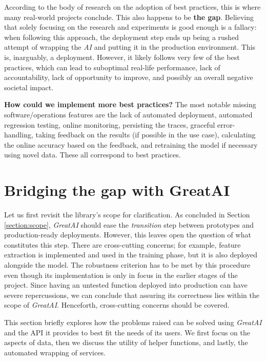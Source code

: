 According to the body of research on the adoption of best practices, this is where many real-world projects conclude. This also happens to be \textbf{the gap}. Believing that solely focusing on the research and experiments is good enough is a fallacy: when following this approach, the deployment step ends up being a rushed attempt of wrapping the \textit{AI} and putting it in the production environment. This is, inarguably, a deployment. However, it likely follows very few of the best practices, which can lead to suboptimal real-life performance, lack of accountability, lack of opportunity to improve, and possibly an overall negative societal impact.

\begin{displayquote}
\textbf{How could we implement more best practices?} The most notable missing software/operations features are the lack of automated deployment, automated regression testing, online monitoring, persisting the traces, graceful error-handling, taking feedback on the results (if possible in the use case), calculating the online accuracy based on the feedback, and retraining the model if necessary using novel data. These all correspond to best practices.
\end{displayquote}

\section{Bridging the gap with GreatAI}

Let us first revisit the library's scope for clarification. As concluded in Section \ref{section:scope}, \textit{GreatAI} should ease the \textit{transition} step between prototypes and production-ready deployments. However, this leaves open the question of what constitutes this step. There are cross-cutting concerns; for example, feature extraction is implemented and used in the training phase, but it is also deployed alongside the model. The robustness criterion has to be met by this procedure even though its implementation is only in focus in the earlier stages of the project. Since having an untested function deployed into production can have severe repercussions, we can conclude that assuring its correctness lies within the scope of \textit{GreatAI}. Henceforth, cross-cutting concerns should be covered.

This section briefly explores how the problems raised can be solved using \textit{GreatAI} and the API it provides to best fit the needs of its users. We first focus on the aspects of data, then we discuss the utility of helper functions, and lastly, the automated wrapping of services.

